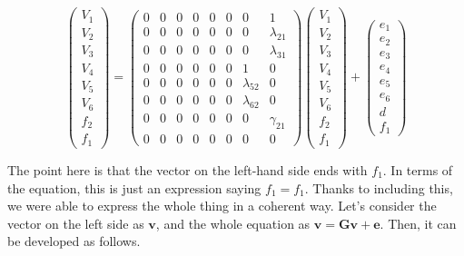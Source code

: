\documentclass{ltjsbook}
\begin{document}
\[
	\begin{pmatrix} V_1 \\ V_2 \\ V_3 \\ V_4 \\ V_5 \\ V_6 \\ f_2 \\f_1 \end{pmatrix} =
	\begin{pmatrix} 0 & 0 & 0 & 0 & 0 & 0 & 0            & 1            \\
                0 & 0 & 0 & 0 & 0 & 0 & 0            & \lambda_{21} \\
                0 & 0 & 0 & 0 & 0 & 0 & 0            & \lambda_{31} \\
                0 & 0 & 0 & 0 & 0 & 0 & 1            & 0            \\
                0 & 0 & 0 & 0 & 0 & 0 & \lambda_{52} & 0            \\
                0 & 0 & 0 & 0 & 0 & 0 & \lambda_{62} & 0            \\
                0 & 0 & 0 & 0 & 0 & 0 & 0            & \gamma_{21}  \\
                0 & 0 & 0 & 0 & 0 & 0 & 0            & 0\end{pmatrix}
	\begin{pmatrix} V_1 \\ V_2 \\ V_3 \\ V_4 \\ V_5 \\ V_6 \\ f_2 \\f_1 \end{pmatrix} +
	\begin{pmatrix} e_1 \\ e_2 \\ e_3 \\ e_4 \\ e_5 \\ e_6 \\ d \\f_1 \end{pmatrix}
\]

The point here is that the vector on the left-hand side ends with $f_1$. In terms of the equation, this is just an expression saying $f_1=f_1$. Thanks to including this, we were able to express the whole thing in a coherent way.
Let's consider the vector on the left side as $\bm{v}$, and the whole equation as $\bm{v} = \bm{Gv}+\bm{e}$. Then, it can be developed as follows.
\end{document}
